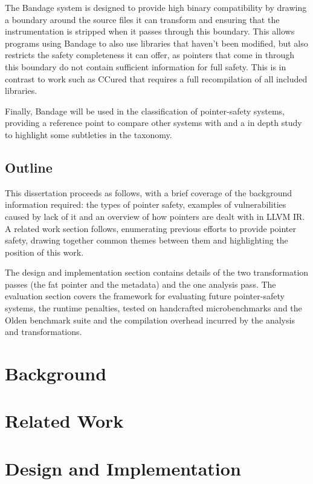 \documentclass[a4paper,12pt,twoside,openright]{report}
\begin{document}
The Bandage system is designed to provide high binary compatibility by drawing a boundary around the source files it can transform and ensuring that the instrumentation is stripped when it passes through this boundary.
This allows programs using Bandage to also use libraries that haven't been modified, but also restricts the safety completeness it can offer, as pointers that come in through this boundary do not contain sufficient information for full safety.
This is in contrast to work such as CCured \cite{necula2002ccured} that requires a full recompilation of all included libraries.

Finally, Bandage will be used in the classification of pointer-safety systems, providing a reference point to compare other systems with and a in depth study to highlight some subtleties in the taxonomy.

\section{Outline}

This dissertation proceeds as follows, with a brief coverage of the background information required: the types of pointer safety, examples of vulnerabilities caused by lack of it and an overview of how pointers are dealt with in LLVM IR.
A related work section follows, enumerating previous efforts to provide pointer safety, drawing together common themes between them and highlighting the position of this work.

The design and implementation section contains details of the two transformation passes (the fat pointer and the metadata) and the one analysis pass.
The evaluation section covers the framework for evaluating future pointer-safety systems, the runtime penalties, tested on handcrafted microbenchmarks and the Olden benchmark suite and the compilation overhead incurred by the analysis and transformations.

\chapter{Background} 


\chapter{Related Work} 


\chapter{Design and Implementation} 

\end{document}
